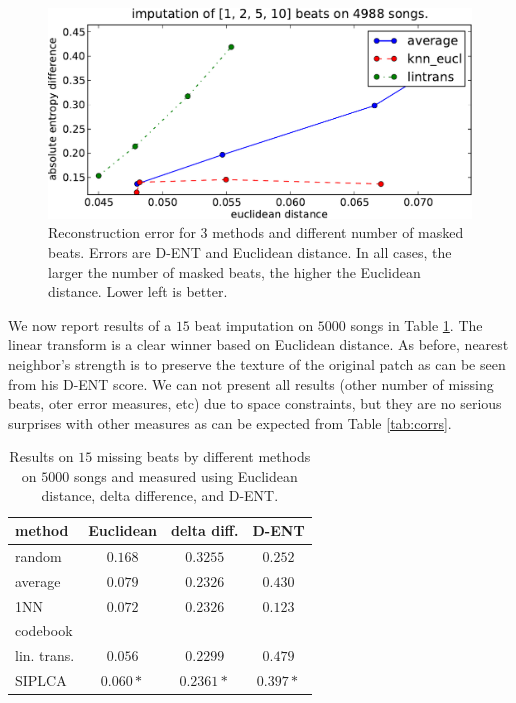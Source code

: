 \documentclass{article}
\begin{document}
\begin{figure}[t]
\begin{center}
\includegraphics[width=.8\columnwidth]{recon_score_in_2d_5k}
\end{center}
\caption{Reconstruction error for $3$ methods and different
number of masked beats. Errors are D-ENT and Euclidean
distance. In all cases, the larger the number of masked beats,
the higher the Euclidean distance. Lower left is better.
\label{fig:2dscore}}
\end{figure}

We now report results of a $15$ beat imputation on $5000$ songs in
Table \ref{tab:res}. The linear transform is a clear winner based on
Euclidean distance. As before, nearest neighbor's strength is to
preserve the texture of the original patch as can be seen from his
D-ENT score. We can not present all results (other number of missing
beats, oter error measures, etc) due to space constraints, but they
are no serious surprises with other measures as can be expected from
Table \ref{tab:corrs}.

\begin{table}[t]
\begin{small}
\begin{center}
\begin{tabular}{|l||c|c|c|} \hline
method & Euclidean & delta diff. & D-ENT \\ \hline
random & $0.168$ & $0.3255$ & $0.252$ \\
average & $0.079$ & $0.2326$ & $0.430$ \\ \hline
1NN & $0.072$ & $0.2326$ & $\mathbf{0.123}$ \\
codebook & & & \\ \hline
lin. trans. & $\mathbf{0.056}$ & $0.2299$ & $0.479$ \\
SIPLCA & $0.060*$ & $0.2361*$ & $0.397*$ \\ \hline
\end{tabular}
\caption{Results on $15$ missing beats by different methods
on $5000$ songs and measured using Euclidean distance, delta
difference, and D-ENT.
\label{tab:res}}
\end{center}
\end{small}
\end{table}
\end{document}
